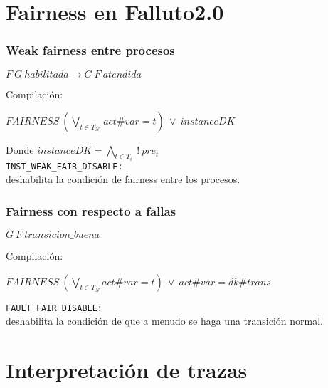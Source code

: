 \documentclass[serif]{beamer}
\begin{document}
\section[Fairness]{Fairness en Falluto2.0}

\begin{frame}
\frametitle{Weak fairness entre procesos}
\begin{framed}
$F~G~habilitada \rightarrow G~F~atendida$
\end{framed}
Compilación:
\begin{framed}
$FAIRNESS~(\bigvee_{t \in T_{N_i}} act\#var = t)~\vee~instanceDK$
\end{framed}
Donde $instanceDK = \bigwedge_{t \in T_i}~!~pre_t~$\\[0.5cm]
\texttt{INST\_WEAK\_FAIR\_DISABLE:}\\
deshabilita la condición de fairness entre los procesos.
\end{frame}


\begin{frame}
\frametitle{Fairness con respecto a fallas}
\begin{framed}
$G~F~transicion\_buena$
\end{framed}
Compilación:
\begin{framed}
$FAIRNESS~(\bigvee_{t \in {T_N}} act\#var = t)~\vee~act\#var = dk\#trans$
\end{framed}
\texttt{FAULT\_FAIR\_DISABLE:}\\
deshabilita la condición de que a menudo se haga una transición normal.\\[0.3cm]
\end{frame}

\section[Trazas]{Interpretación de trazas}
\end{document}
